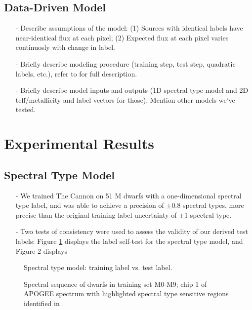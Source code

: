 \documentclass[modern]{aastex62}
\begin{document}
\subsection{Data-Driven Model}
\begin{enumerate}
\item[-] Describe assumptions of the model: (1) Sources with identical labels have near-identical flux at each pixel; (2) Expected flux at each pixel varies continuosly with change in label. 
\item[-] Briefly describe modeling procedure (training step, test step, quadratic labels, etc.), refer to \citealt{Ness:2015} for full description.
\item[-] Briefly describe model inputs and outputs (1D spectral type model and 2D teff/metallicity and label vectors for those). Mention other models we've tested.
\end{enumerate}


\section{Experimental Results} \label{sec:results}

\subsection{Spectral Type Model}

\begin{enumerate}
\item[-] We trained The Cannon on 51 M dwarfs with a one-dimensional spectral type label, and was able to achieve a precision of $\pm$0.8 spectral types, more precise than the original training label uncertainty of $\pm$1 spectral type.
\item[-] Two tests of consistency were used to assess the validity of our derived test labels: Figure \ref{fig:west_selftest} displays the label self-test for the spectral type model, and Figure 2 displays 
\end{enumerate}


\begin{figure}[ht]
\caption{Spectral type model: training label vs. test label.} \label{fig:west_selftest}
\end{figure}


\begin{figure}[ht]
\caption{ Spectral sequence of dwarfs in training set M0-M9; chip 1 of APOGEE
spectrum with highlighted spectral type sensitive regions identified in \citealt{Desphande:2013}.} \label{fig:sp_sequence}
\end{figure}
\end{document}
